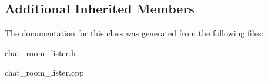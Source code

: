 \subsection*{Additional Inherited Members}


The documentation for this class was generated from the following files\+:\begin{DoxyCompactItemize}
\item 
chat\+\_\+room\+\_\+lister.\+h\item 
chat\+\_\+room\+\_\+lister.\+cpp\end{DoxyCompactItemize}
